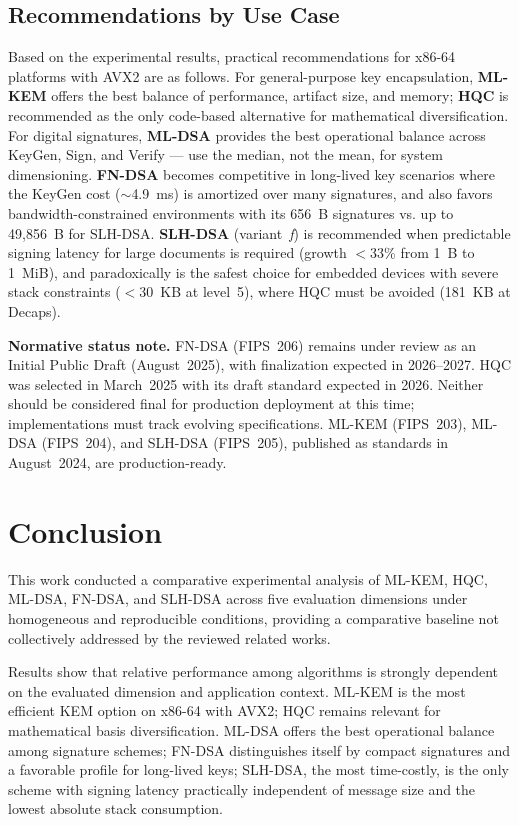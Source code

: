 \documentclass[12pt]{article}
\begin{document}
\subsection{Recommendations by Use Case}
\label{subsec:recomendacoes}
Based on the experimental results, practical recommendations for x86-64
platforms with AVX2 are as follows. For general-purpose key encapsulation,
\textbf{ML-KEM} offers the best balance of performance, artifact size, and
memory; \textbf{HQC} is recommended as the only code-based alternative for
mathematical diversification. For digital signatures, \textbf{ML-DSA}
provides the best operational balance across KeyGen, Sign, and Verify ---
use the median, not the mean, for system dimensioning. \textbf{FN-DSA}
becomes competitive in long-lived key scenarios where the KeyGen cost
($\sim$4.9~ms) is amortized over many signatures, and also favors
bandwidth-constrained environments with its 656~B signatures vs. up to
49,856~B for SLH-DSA. \textbf{SLH-DSA} (variant~\textit{f}) is recommended
when predictable signing latency for large documents is required (growth
$<$33\% from 1~B to 1~MiB), and paradoxically is the safest choice for
embedded devices with severe stack constraints ($<$30~KB at level~5),
where HQC must be avoided (181~KB at Decaps).

\textbf{Normative status note.} FN-DSA (FIPS~206) remains under review as
an Initial Public Draft (August~2025), with finalization expected in
2026--2027. HQC was selected in March~2025 with its draft standard expected
in 2026. Neither should be considered final for production deployment at
this time; implementations must track evolving specifications. ML-KEM
(FIPS~203), ML-DSA (FIPS~204), and SLH-DSA (FIPS~205), published as
standards in August~2024, are production-ready.

\section{Conclusion}
\label{sec:conclusao}
This work conducted a comparative experimental analysis of ML-KEM, HQC,
ML-DSA, FN-DSA, and SLH-DSA across five evaluation dimensions under
homogeneous and reproducible conditions, providing a comparative baseline
not collectively addressed by the reviewed related works.

Results show that relative performance among algorithms is strongly
dependent on the evaluated dimension and application context. ML-KEM is the
most efficient KEM option on x86-64 with AVX2; HQC remains relevant for
mathematical basis diversification. ML-DSA offers the best operational
balance among signature schemes; FN-DSA distinguishes itself by compact
signatures and a favorable profile for long-lived keys; SLH-DSA, the most
time-costly, is the only scheme with signing latency practically independent
of message size and the lowest absolute stack consumption.
\end{document}
